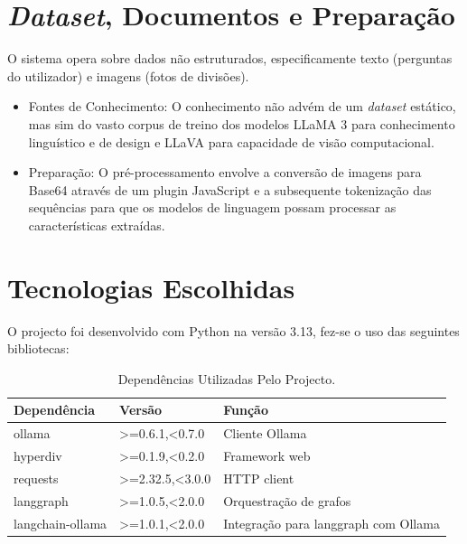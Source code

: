 \documentclass[a4paper,12pt]{scrreprt}
\begin{document}
    \section{\textit{Dataset}, Documentos e Preparação}
        O sistema opera sobre dados não estruturados, especificamente texto (perguntas do utilizador) e imagens (fotos de divisões).
        \begin{itemize}
            \item Fontes de Conhecimento: O conhecimento não advém de um \textit{dataset} estático, mas sim do vasto corpus de treino dos modelos LLaMA 3 \cite{llama} para conhecimento linguístico e de design e LLaVA \cite{llava} para capacidade de visão computacional.
            \item Preparação: O pré-processamento envolve a conversão de imagens para Base64 através de um plugin JavaScript e a subsequente tokenização das sequências para que os modelos de linguagem possam processar as características extraídas.
        \end{itemize}
    \section{Tecnologias Escolhidas}
        O projecto foi desenvolvido com Python na versão 3.13, fez-se o uso das seguintes bibliotecas:
        \begin{table}[!h]
            \centering
            \begin{tabular}{|p{3.4cm}|p{4cm}|p{5cm}|}
               \hline
               \rowcolor{gray!20!white}
                Dependência & Versão & Função \\
                \hline
                ollama & >=0.6.1,<0.7.0 & Cliente Ollama \\
                \hline
                hyperdiv & >=0.1.9,<0.2.0 & Framework web \\
                \hline
                requests & >=2.32.5,<3.0.0 & HTTP client \\
                \hline
                langgraph & >=1.0.5,<2.0.0 & Orquestração de grafos \\
                \hline
                langchain-ollama & >=1.0.1,<2.0.0 & Integração para langgraph com Ollama \\
                \hline
            \end{tabular}
            \caption{Dependências Utilizadas Pelo Projecto.}
        \end{table}
\end{document}
